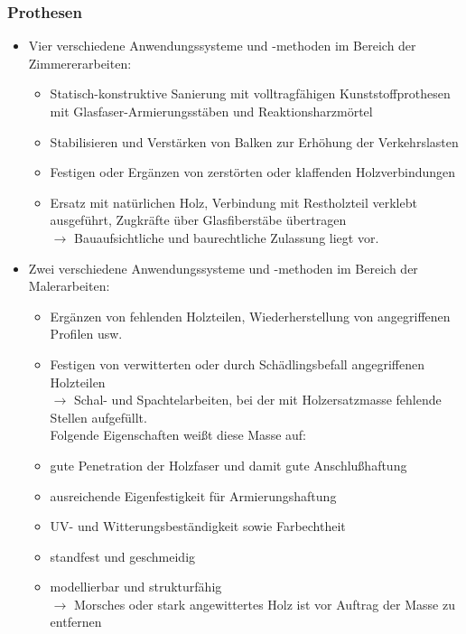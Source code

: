 \documentclass[fleqn,twoside]{article}
\begin{document}
        \subsubsection{Prothesen}
             \begin{minipage}{0.5\textwidth}
                \begin{itemize}
                    \item Vier verschiedene Anwendungssysteme und -methoden im Bereich der Zimmererarbeiten:
                        \begin{itemize}
                            \item Statisch-konstruktive Sanierung mit volltragfähigen Kunststoffprothesen mit Glasfaser-Armierungsstäben und Reaktionsharzmörtel
                            \item Stabilisieren und Verstärken von Balken zur Erhöhung der Verkehrslasten
                            \item Festigen oder Ergänzen von zerstörten oder klaffenden Holzverbindungen
                            \item Ersatz mit natürlichen Holz, Verbindung mit Restholzteil verklebt ausgeführt, Zugkräfte über Glasfiberstäbe übertragen\\
                            $\rightarrow$ Bauaufsichtliche und baurechtliche Zulassung liegt vor. 
                        \end{itemize}
                    \item Zwei verschiedene Anwendungssysteme und -methoden im Bereich der Malerarbeiten:
                        \begin{itemize}
                            \item Ergänzen von fehlenden Holzteilen, Wiederherstellung von angegriffenen Profilen usw.
                            \item Festigen von verwitterten oder durch Schädlingsbefall angegriffenen Holzteilen\\ 
                            $\rightarrow$ Schal- und Spachtelarbeiten, bei der mit Holzersatzmasse fehlende Stellen aufgefüllt.\\
                            Folgende Eigenschaften weißt diese Masse auf:
                            \item gute Penetration der Holzfaser und damit gute Anschlußhaftung
                            \item ausreichende Eigenfestigkeit für Armierungshaftung
                            \item UV- und Witterungsbeständigkeit sowie Farbechtheit
                            \item standfest und geschmeidig
                            \item modellierbar und strukturfähig\\
                            $\rightarrow$ Morsches oder stark angewittertes Holz ist vor Auftrag der Masse zu entfernen
                        \end{itemize}
                \end{itemize}
        
            \end{minipage}
\end{document}
